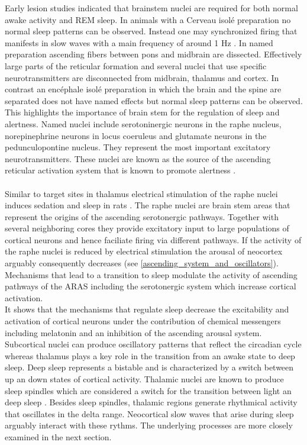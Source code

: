 Early lesion studies indicated that brainstem nuclei are required for both normal awake activity and REM sleep. In animals with a Cerveau isolé preparation no normal sleep patterns can be observed. Instead one may synchronized firing that manifests in slow waves with a main frequency of around 1 Hz \parencite{kawamura1968hippocampal}. In named preparation ascending fibers between pons and midbrain are dissected. Effectively large parts of the reticular formation and several nuclei that use specific neurotransmitters are disconnected from midbrain, thalamus and cortex. In contrast an encéphale isolé preparation in which the brain and the spine are separated does not have named effects but normal sleep patterns can be observed. This highlights the importance of brain stem for the regulation of sleep and alertness. Named nuclei include serotoninergic neurons in the raphe nucleus, norepinephrine neurons in locus coeruleus and glutamate neurons in the pedunculopontine nucleus. They represent the most important excitatory neurotransmitters. These nuclei are known as the source of the ascending reticular activation system that is known to promote alertness \parencite{brown2012control}.\\
\\Similar to target sites in thalamus electrical stimulation of the raphe nuclei induces sedation and sleep in rats \parencite{kostowski1969electrical}. The raphe nuclei are brain stem areas that represent the origins of the ascending serotonergic pathways. Together with several neighboring cores they provide excitatory input to large populations of cortical neurons and hence faciliate firing via different pathways. If the activity of the raphe nuclei is reduced by electrical stimulation the arousal of neocortex arguably consequently decreases (see \ref{ascending_system_and_oscillators}). Mechanisms that lead to a transition to sleep modulate the activity of ascending pathways of the ARAS including the serotonergic system which increase cortical activation.\\
It shows that the mechanisms that regulate sleep decrease the excitability and activation of cortical neurons under the contribution of chemical messengers including melatonin and an inhibition of the ascending arousal system. Subcortical nuclei can produce oscillatory patterns that reflect the circadian cycle whereas thalamus plays a key role in the transition from an awake state to deep sleep. Deep sleep represents a bistable and is characterized by a switch between up an down states of cortical activity. Thalamic nuclei are known to produce sleep spindles which are considered a switch for the transition between light an deep sleep \parencite{montagna2005fatal}. Besides sleep spindles, thalamic regions generate rhythmical activity that oscillates in the delta range. Neocortical slow waves that arise during sleep arguably interact with these rythms. The underlying processes are more closely examined in the next section.

